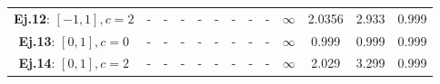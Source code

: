 \begin{table}
\begin{tabular}{|c|cccc|cccc|cccc|}
		\textbf{Ej.12}: $[-1,1], c=2$              & -                                             & -                                                & -                                   & -              & -              & -                       & -          & -              & $\infty$       & 2.0356                  & 2.933      & 0.999          \\
		\textbf{Ej.13}: $[0,1], c=0$               & -                                             & -                                                & -                                   & -              & -              & -                       & -          & -              & $\infty$       & 0.999                   & 0.999      & 0.999          \\
		\textbf{Ej.14}: $[0,1], c=2$               & -                                             & -                                                & -                                   & -              & -              & -                       & -          & -              & $\infty$       & 2.029                   & 3.299      & 0.999          \\
		\hline
	\end{tabular}
\end{table}